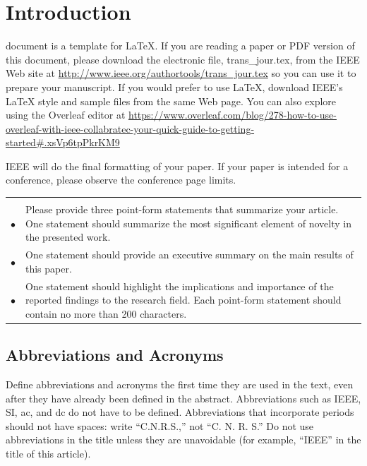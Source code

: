 \documentclass[journal,twoside,web]{ieeecolor}
\begin{document}
\maketitle

\section{Introduction}
\label{sec:introduction}
 document is a template for \LaTeX. If you are 
reading a paper or PDF version of this document, please download the 
electronic file, trans\_jour.tex, from the IEEE Web site at \underline
{http://www.ieee.org/authortools/trans\_jour.tex} so you can use it to prepare your manuscript. If 
you would prefer to use LaTeX, download IEEE's LaTeX style and sample files 
from the same Web page. You can also explore using the Overleaf editor at 
\underline
{https://www.overleaf.com/blog/278-how-to-use-overleaf-with-}\discretionary{}{}{}\underline
{ieee-collabratec-your-quick-guide-to-getting-started\#.}\discretionary{}{}{}\underline{xsVp6tpPkrKM9}

IEEE will do the final formatting of your paper. If your paper is intended 
for a conference, please observe the conference page limits. 

\begin{table}[!t]
\setlength{\arrayrulewidth}{1pt}
{\sffamily\bfseries\begin{tabular}{lp{6.75in}}\hline
\rowcolor{abstractbg}\multicolumn{2}{l}{\color{subsectioncolor}{\itshape
Highlights}{\Huge\strut}}\\
\rowcolor{abstractbg}$\bullet$ & Please provide three point-form
statements that summarize your article. One statement should
summarize the most significant element of novelty in the presented
work.\\
\rowcolor{abstractbg}$\bullet${\large\strut} & One statement should provide an
executive summary on the main results of this paper.\\
\rowcolor{abstractbg}$\bullet${\large\strut} & One statement should highlight the
implications and importance of the reported findings to the research
field. Each point-form statement should contain no more than 200
characters.\\[2em]\hline
\end{tabular}}
\setlength{\arrayrulewidth}{0.4pt}
\end{table}

\subsection{Abbreviations and Acronyms}
Define abbreviations and acronyms the first time they are used in the text, 
even after they have already been defined in the abstract. Abbreviations 
such as IEEE, SI, ac, and dc do not have to be defined. Abbreviations that 
incorporate periods should not have spaces: write ``C.N.R.S.,'' not ``C. N. 
R. S.'' Do not use abbreviations in the title unless they are unavoidable 
(for example, ``IEEE'' in the title of this article).
\end{document}
